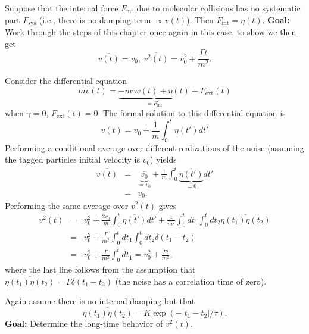 
Suppose that the internal force $F_\text{int}$ due to molecular collisions has no systematic part $F_\text{sys}$ (i.e., there is no damping term $\propto v(t)$). Then $F_\text{int}=\eta(t)$. \textbf{Goal:} Work through the steps of this chapter once again in this case, to show we then get
\begin{equation}
\overline{v(t)} = v_0,~\overline{v^2(t)} = v_0^2 + \frac{\Gamma t}{m^2}.
\end{equation}

Consider the differential equation
\begin{equation}
m \dot{v}(t) = \underbrace{-m \gamma v(t) + \eta(t)}_{=F_\text{int}} + F_\text{ext}(t)
\end{equation}
when $\gamma=0$, $F_\text{ext}(t)=0$. The formal solution to this differential equation is
\begin{equation}
v(t) = v_0 + \frac{1}{m} \int_{0}^{t} \eta(t') dt'
\end{equation}
Performing a conditional average over different realizations of the noise (assuming the tagged particles initial velocity is $v_0$) yields
\begin{eqnarray}
\overline{v(t)}&=& \underbrace{\overline{v_0}}_{=v_0} + \frac{1}{m} \int_{0}^{t} \underbrace{\overline{\eta(t')}}_{=0} dt' \\
&=& v_0.
\end{eqnarray}
Performing the same average over $v^2(t)$ gives
\begin{eqnarray}
\overline{v^2(t)}&=& \overline{v_0^2} + \frac{2 v_0 }{m} \int_{0}^{t} \overline{\eta(t')} dt' + \frac{1}{m^2} \int_{0}^{t} dt_1 \int_{0}^{t} dt_2 \overline{\eta(t_1) \eta(t_2)}  \\
&=& v_0^2 + \frac{\Gamma}{m^2} \int_{0}^{t} dt_1 \int_{0}^{t} dt_2 \delta(t_1-t_2) \\
&=& \boxed{v_0^2 + \frac{\Gamma}{m^2} \int_{0}^{t} dt_1 = v_0^2 + \frac{\Gamma t}{m^2}},
\end{eqnarray}
where the last line follows from the assumption that $\overline{\eta(t_1) \eta(t_2)}=\Gamma \delta(t_1-t_2)$ (the noise has a correlation time of zero).


Again assume there is no internal damping but that
\begin{equation}
\overline{\eta(t_1) \eta(t_2)} = K \exp(-|t_1-t_2|/\tau).
\end{equation}
\textbf{Goal:} Determine the long-time behavior of $\overline{v^2(t)}$.

